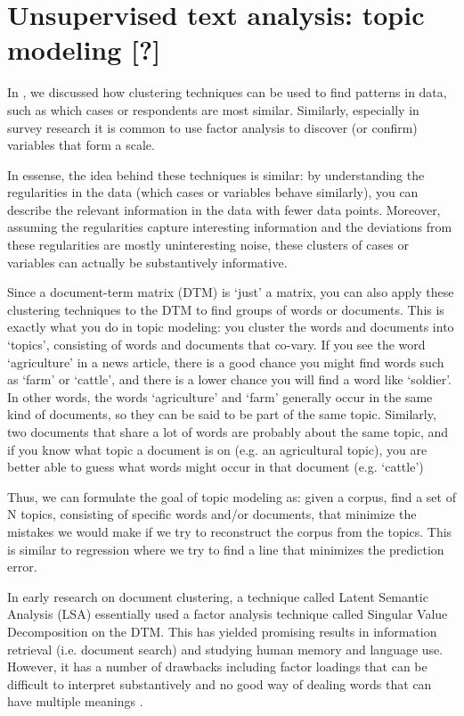 \section{Unsupervised text analysis: topic modeling [?]}
\label{sec:unsupervised}

In , we discussed how clustering techniques can be used to find patterns in data,
such as which cases or respondents are most similar.
Similarly, especially in survey research it is common to use factor analysis to discover (or confirm) variables that form a scale.

In essense, the idea behind these techniques is similar:
by understanding the regularities in the data (which cases or variables behave similarly),
you can describe the relevant information in the data with fewer data points.
Moreover, assuming the regularities capture interesting information and the deviations from these regularities are mostly
uninteresting noise, these clusters of cases or variables can actually be substantively informative.

Since a document-term matrix (DTM) is `just' a matrix, you can also apply these clustering techniques to the DTM
to find groups of words or documents.
This is exactly what you do in topic modeling:
you cluster the words and documents into `topics', consisting of words and documents that co-vary.
If you see the word `agriculture' in a news article, there is a good chance you might find words such as `farm' or `cattle',
and there is a lower chance you will find a word like `soldier'.
In other words, the words `agriculture' and `farm' generally occur in the same kind of documents, so they can be said to be part of the same topic.
Similarly, two documents that share a lot of words are probably about the same topic,
and if you know what topic a document is on (e.g. an agricultural topic), you are better able to guess what words might occur in that document (e.g. `cattle')

Thus, we can formulate the goal of topic modeling as: given a corpus, find a set of N topics, consisting of specific words and/or documents, that minimize the mistakes we would make if we try to reconstruct the corpus from the topics.
This is similar to regression where we try to find a line that minimizes the prediction error.

In early research on document clustering, a technique called Latent Semantic Analysis (LSA) essentially used a factor analysis technique called Singular Value Decomposition on the DTM.
This has yielded promising results in information retrieval (i.e. document search) and studying human memory and language use.
However, it has a number of drawbacks including factor loadings that can be difficult to interpret substantively and no good way of dealing words that can have multiple meanings \citep{lsa}.

